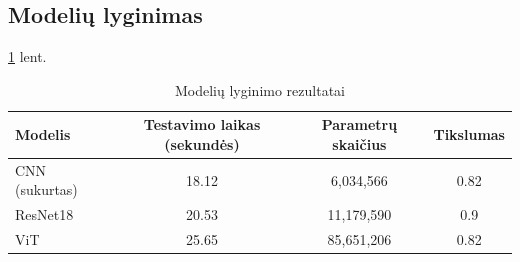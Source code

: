 \documentclass[conference]{IEEEtran}
\begin{document}
\subsection{Modelių lyginimas}

\ref{tab:comparison} lent.

\begin{table}[p]
    \vfill
    \centering
    \caption{Modelių lyginimo rezultatai}
    \label{tab:comparison}
    \begin{tabular}{lccc}
    \hline
    Modelis & Testavimo laikas (sekundės) & Parametrų skaičius & Tikslumas \\
    \hline
    CNN (sukurtas) & 18.12 & 6,034,566 & 0.82 \\
    ResNet18 & 20.53 & 11,179,590 & 0.9 \\
    ViT & 25.65 & 85,651,206 & 0.82 \\
    \hline
    \end{tabular}
\end{table}

\begingroup
\small


\endgroup
\end{document}
